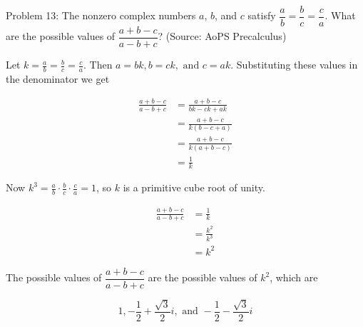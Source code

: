 Problem 13: The nonzero complex numbers $a$, $b$, and $c$ satisfy $\dfrac{a}{b} = \dfrac{b}{c} = \dfrac{c}{a}$. What are the possible values of $\dfrac{a+b-c}{a-b+c}$? (Source: AoPS Precalculus)

Let $\displaystyle k = \frac{a}{b} = \frac{b}{c} = \frac{c}{a}$. Then $a = bk, b = ck, \text{ and } c = ak$. Substituting these values in the denominator we get

\begin{align*}
\frac{a + b - c}{a - b + c} &= \frac{a + b - c}{bk - ck + ak} \\
&= \frac{a + b - c}{k(b - c + a)} \\
&= \frac{a + b - c}{k(a + b - c)} \\
&= \frac{1}{k}
\end{align*}

Now $\displaystyle k^3 = \frac{a}{b} \cdot \frac{b}{c} \cdot \frac{c}{a} = 1$, so $k$ is a primitive cube root of unity.

\begin{align*}
\frac{a + b - c}{a - b + c} &= \frac{1}{k} \\
&= \frac{k^2}{k^3} \\
&= k^2
\end{align*}

The possible values of $\dfrac{a + b - c}{a - b + c}$ are the possible values of $k^2$, which are

$$ \boxed{1, -\frac{1}{2} + \frac{\sqrt 3}{2}i, \text{ and } -\frac{1}{2} - \frac{\sqrt 3}{2}i} $$

